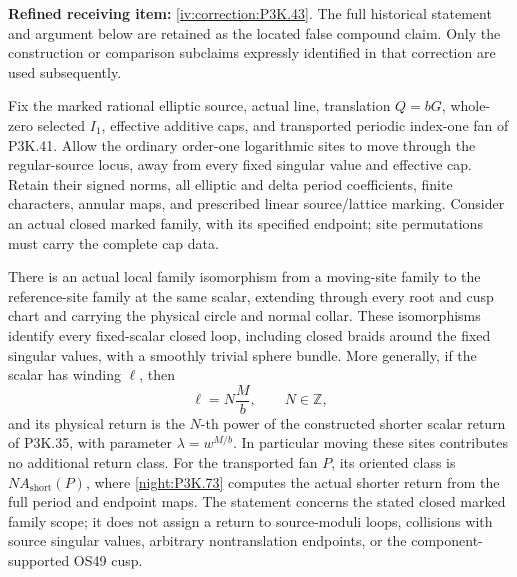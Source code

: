 \begin{theorem}\hypertarget{tag-02UO}{}\label{night:P3K.43}

\par\noindent\textbf{Refined receiving item:} \cref{iv:correction:P3K.43}. The full historical statement and argument below are retained as the located false compound claim. Only the construction or comparison subclaims expressly identified in that correction are used subsequently.

Fix the marked rational elliptic source, actual line, translation
\(Q=bG\), whole-zero selected \(I_1\), effective additive caps,
and transported periodic index-one fan of P3K.41. Allow the ordinary
order-one logarithmic sites to move through the regular-source locus,
away from every fixed singular value and effective cap. Retain their
signed norms, all elliptic and delta period coefficients, finite
characters, annular maps, and prescribed linear source/lattice marking.
Consider an actual closed marked family, with its specified endpoint;
site permutations must carry the complete cap data.

There is an actual local family isomorphism from a moving-site family
to the reference-site family at the same scalar, extending through every
root and cusp chart and carrying the physical circle and normal collar.
These isomorphisms identify every fixed-scalar closed loop, including
closed braids around the fixed singular values, with a smoothly trivial
sphere bundle. More generally, if the scalar has winding \(\ell\),
then
\[
                    \ell=N\frac{M}{b},\qquad N\in\mathbb Z,
\]
and its physical return is the \(N\)-th power of the constructed
shorter scalar return of P3K.35, with parameter
\(\lambda=w^{M/b}\). In particular moving these sites contributes
no additional return class. For the transported fan \(P\), its oriented class is
\(N A_{\mathrm{short}}(P)\), where \cref{night:P3K.73} computes the
actual shorter return from the full period and endpoint maps.
The statement concerns the stated closed marked family scope; it does
not assign a return to source-moduli loops, collisions with source
singular values, arbitrary nontranslation endpoints, or the
component-supported OS49 cusp.


\end{theorem}

